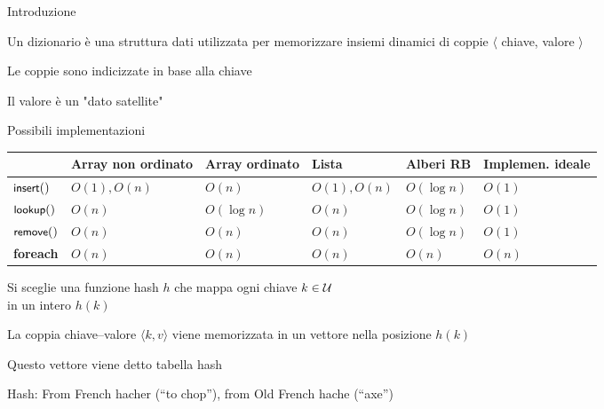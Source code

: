 \begin{frame}{Introduzione}

\vspace{-6pt}
\begin{myboxtitle}[Ripasso]
Un dizionario è una struttura dati utilizzata per memorizzare insiemi dinamici
di \alert{coppie $\langle$ chiave, valore $\rangle$}
\BI
\item Le coppie sono indicizzate in base alla chiave
\item Il valore è un "dato satellite"
\EI
\end{myboxtitle}


\end{frame}

\begin{frame}{Possibili implementazioni}

{\footnotesize
\begin{tabular}{ | P{1.3cm} | P{1.7cm} | P{1.6cm} | P{1.6cm} | P{1.6cm} | P{1.6cm} |}
\hline
& \textbf{Array non ordinato} & 	\textbf{Array ordinato} & \textbf{Lista} & \textbf{Alberi RB} & \textbf{Implemen. ideale} \\\hline
$\textsf{{\small insert}}()$ & $O(1),O(n)$ & $O(n)$ & $O(1), O(n)$ & $O(\log n)$ & $O(1)$ \\\hline
$\textsf{{\small lookup}}()$ & $O(n)$ & $O(\log n)$ &  $O(n)$ &  $O(\log n)$ &  $O(1)$\\\hline
$\textsf{{\small remove}}()$ & $O(n)$ & $O(n)$ & $O(n)$ & $O(\log n)$ & $O(1)$\\\hline
\textbf{foreach} & $O(n)$ & $O(n)$ & $O(n)$ & $O(n)$ & $O(n)$\\\hline
\end{tabular}
}


\BI
\item Si sceglie una \alert{funzione hash} $h$ che mappa ogni chiave $k \in \cal U$\\ in un intero $h(k)$ 
\item La coppia chiave--valore $\langle k,v \rangle$ viene memorizzata in un vettore nella posizione $h(k)$
\item Questo vettore viene detto \alert{tabella hash}
\item Hash: From French \alert{hacher} (“to chop”), from Old French \alert{hache} (“axe”)
\EI

\end{frame}

